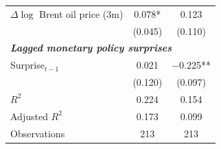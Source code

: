{\begin{tabular}{lcc}
$\Delta \log$ Brent oil price (3m)       
& 0.078* 
& 0.123  \\
& (0.045) 
& (0.110) \\[0.4em]

\multicolumn{3}{l}{\textbf{\emph{Lagged monetary policy surprises}}} \\[0.2em]
Surprise$_{t-1}$                      
& 0.021  
& $-$0.225** \\
& (0.120)  
& (0.097) \\[0.4em]

\midrule
$R^2$              & 0.224 & 0.154 \\
Adjusted $R^2$     & 0.173 & 0.099 \\
Observations       & 213   & 213   \\
\bottomrule
\end{tabular}
}